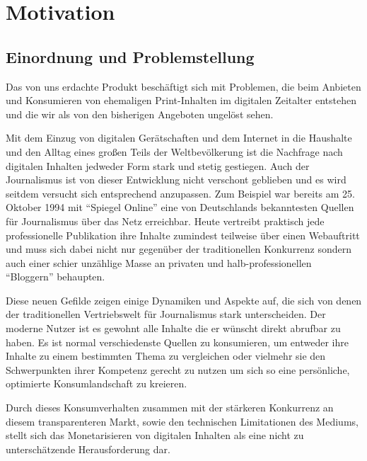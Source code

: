 
\section{Motivation}

\subsection{Einordnung und Problemstellung}

Das von uns erdachte Produkt beschäftigt sich mit Problemen, die beim Anbieten und Konsumieren von ehemaligen Print-Inhalten im digitalen Zeitalter entstehen und die wir als von den bisherigen Angeboten ungelöst sehen.

Mit dem Einzug von digitalen Gerätschaften und dem Internet in die Haushalte und den Alltag eines großen Teils der Weltbevölkerung ist die Nachfrage nach digitalen Inhalten jedweder Form stark und stetig gestiegen. Auch der Journalismus ist von dieser Entwicklung nicht verschont geblieben und es wird seitdem versucht sich entsprechend anzupassen. Zum Beispiel war bereits am 25. Oktober 1994 mit \enquote{Spiegel Online} eine von Deutschlands bekanntesten Quellen für Journalismus über das Netz erreichbar. Heute vertreibt praktisch jede professionelle Publikation ihre Inhalte zumindest teilweise über einen Webauftritt und muss sich dabei nicht nur gegenüber der traditionellen Konkurrenz sondern auch einer schier unzählige Masse an privaten und halb-professionellen \enquote{Bloggern} behaupten.

Diese neuen Gefilde zeigen einige Dynamiken und Aspekte auf, die sich von denen der traditionellen Vertriebswelt für Journalismus stark unterscheiden. Der moderne Nutzer ist es gewohnt alle Inhalte die er wünscht direkt abrufbar zu haben. Es ist normal verschiedenste Quellen zu konsumieren, um entweder ihre Inhalte zu einem bestimmten Thema zu vergleichen oder vielmehr sie den Schwerpunkten ihrer Kompetenz gerecht zu nutzen um sich so eine persönliche, optimierte Konsumlandschaft zu kreieren.

Durch dieses Konsumverhalten zusammen mit der stärkeren Konkurrenz an diesem transparenteren Markt, sowie den technischen Limitationen des Mediums, stellt sich das Monetarisieren von digitalen Inhalten als eine nicht zu unterschätzende Herausforderung dar.

